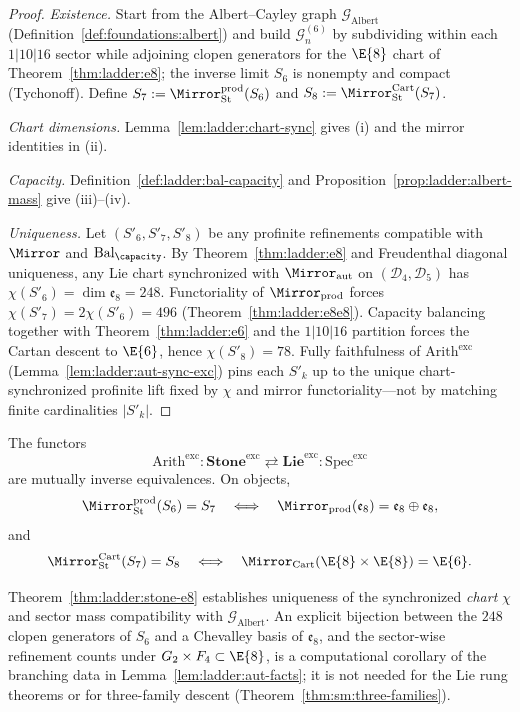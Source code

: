 \begin{proof}
\emph{Existence.}
Start from the Albert--Cayley graph
$\mathcal{G}_{\mathrm{Albert}}$ (Definition~\ref{def:foundations:albert}) and
build $\mathcal{G}_n^{(6)}$ by subdividing within each $1|10|16$ sector while
adjoining clopen generators for the $\E{8}$ chart of
Theorem~\ref{thm:ladder:e8}; the inverse limit $S_6$ is nonempty and compact
(Tychonoff). Define $S_7:=\Mirror_{\mathrm{St}}^{\mathrm{prod}}(S_6)$ and
$S_8:=\Mirror_{\mathrm{St}}^{\mathrm{Cart}}(S_7)$.

\emph{Chart dimensions.}
Lemma~\ref{lem:ladder:chart-sync} gives (i) and the mirror identities in (ii).

\emph{Capacity.}
Definition~\ref{def:ladder:bal-capacity} and
Proposition~\ref{prop:ladder:albert-mass} give (iii)--(iv).

\emph{Uniqueness.}
Let $(S'_6,S'_7,S'_8)$ be any profinite refinements compatible with
$\Mirror$ and $\mathrm{Bal}_\capacity$. By Theorem~\ref{thm:ladder:e8} and
Freudenthal diagonal uniqueness, any Lie chart synchronized with
$\Mirror_{\mathrm{aut}}$ on $(\mathcal{D}_4,\mathcal{D}_5)$ has
$\chi(S'_6)=\dim\mathfrak{e}_8=248$. Functoriality of
$\Mirror_{\mathrm{prod}}$ forces $\chi(S'_7)=2\chi(S'_6)=496$
(Theorem~\ref{thm:ladder:e8e8}). Capacity balancing together with
Theorem~\ref{thm:ladder:e6} and the $1|10|16$ partition forces the Cartan
descent to $\E{6}$, hence $\chi(S'_8)=78$. Fully faithfulness of
$\mathrm{Arith}^{\mathrm{exc}}$ (Lemma~\ref{lem:ladder:aut-sync-exc}) pins
each $S'_k$ up to the unique chart-synchronized profinite lift fixed by
$\chi$ and mirror functoriality---not by matching finite cardinalities
$|S'_k|$.
\end{proof}

\begin{corollary}
\label{cor:ladder:exc-equiv}
The functors
\[
  \mathrm{Arith}^{\mathrm{exc}}:\mathbf{Stone}^{\mathrm{exc}}\rightleftarrows
  \mathbf{Lie}^{\mathrm{exc}}:\mathrm{Spec}^{\mathrm{exc}}
\]
are mutually inverse equivalences. On objects,
\[
  \Mirror_{\mathrm{St}}^{\mathrm{prod}}(S_6)=S_7
  \quad\Longleftrightarrow\quad
  \Mirror_{\mathrm{prod}}(\mathfrak{e}_8)=\mathfrak{e}_8\oplus\mathfrak{e}_8,
\]
and
\[
  \Mirror_{\mathrm{St}}^{\mathrm{Cart}}(S_7)=S_8
  \quad\Longleftrightarrow\quad
  \Mirror_{\mathrm{Cart}}(\E{8}\times\E{8})=\E{6}.
\]
\end{corollary}

\begin{remark}\label{rem:ladder:stone-cells}
Theorem~\ref{thm:ladder:stone-e8} establishes uniqueness of the synchronized
\emph{chart} $\chi$ and sector mass compatibility with
$\mathcal{G}_{\mathrm{Albert}}$. An explicit bijection between the $248$
clopen generators of $S_6$ and a Chevalley basis of $\mathfrak{e}_8$, and the
sector-wise refinement counts under $G_2\times F_4\subset\E{8}$, is a
computational corollary of the branching data in
Lemma~\ref{lem:ladder:aut-facts}; it is not needed for the Lie rung theorems
or for three-family descent (Theorem~\ref{thm:sm:three-families}).
\end{remark}

